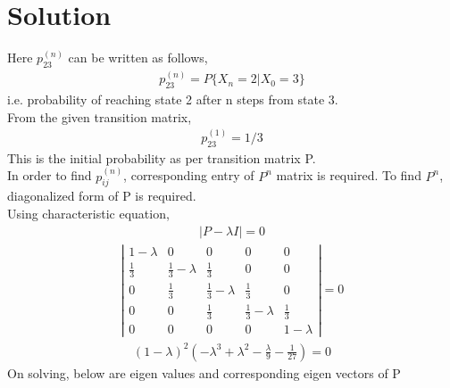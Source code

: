 \documentclass[journal,12pt,twocolumn]{IEEEtran}
\begin{document}
\section{Solution}
Here $p_{23}^{(n)}$ can be written as follows,
\begin{align}
   p_{23}^{(n)} = P\{X_{n}=2|X_{0}=3\} 
\end{align}
i.e. probability of reaching state 2 after n steps from state 3.
\\
From the given transition matrix,
\begin{align}
   p_{23}^{(1)} = 1/3
\end{align}
This is the initial probability as per transition matrix P. 
\\
In order to find $p_{ij}^{(n)}$, corresponding entry of $P^n$ matrix is required.
To find $P^n$, diagonalized form of P is required.  \\
Using characteristic equation,
\begin{align}
    |P-\lambda I|=0
\end{align}
\begin{align}
    \left|\begin{array}{ccccc}1 - \lambda & 0 & 0 & 0 & 0\\\frac{1}{3} & \frac{1}{3} - \lambda & \frac{1}{3} & 0 & 0\\0 & \frac{1}{3} & \frac{1}{3} - \lambda & \frac{1}{3} & 0\\0 & 0 & \frac{1}{3} & \frac{1}{3} - \lambda & \frac{1}{3}\\0 & 0 & 0 & 0 & 1 - \lambda\end{array}\right| = 0
\end{align}
\begin{align}
\left(1-\lambda\right)^{2} \left(- \lambda^{3} + \lambda^{2} - \frac{\lambda}{9} - \frac{1}{27}\right) = 0
\end{align}
On solving, below are eigen values and corresponding eigen vectors of P
\end{document}
